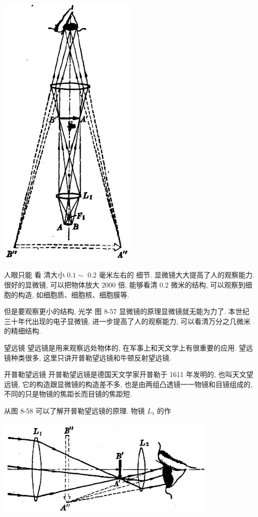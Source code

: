 \documentclass[10pt]{article}
\begin{document}
\begin{center}
\includegraphics[max width=0.5\textwidth]{images/01913056-1f15-74d8-9184-9aab52c9d66b_290_516295.jpg}
\end{center}

人眼只能 看 清大小 \({0.1} \sim\) 0.2 毫米左右的 细节. 显微镜大大提高了人的观察能力. 很好的显微镜, 可以把物体放大 2000 倍, 能够看清 0.2 微米的结构, 可以观察到细胞的构造, 如细胞质、细胞核、细胞膜等.

但是要观察更小的结构, 光学 图 8-57 显微镜的原理显微镜就无能为力了. 本世纪三十年代出现的电子显微镜, 进一步提高了人的观察能力, 可以看清万分之几微米的精细结构.

望远镜 望远镜是用来观察远处物体的, 在军事上和天文学上有很重要的应用. 望远镜种类很多, 这里只讲开普勒望远镜和牛顿反射望远镜.

开普勒望远镜 开普勒望远镜是德国天文学家开普勒于 1611 年发明的, 也叫天文望远镜, 它的构造跟显微镜的构造差不多, 也是由两组凸透镜一一物镜和目镜组成的, 不同的只是物镜的焦距长而目镜的焦距短.

从图 8-58 可以了解开普勒望远镜的原理. 物镜 \({L}_{1}\) 的作

\begin{center}
\includegraphics[max width=0.8\textwidth]{images/01913056-1f15-74d8-9184-9aab52c9d66b_291_257033.jpg}
\end{center}
\end{document}
